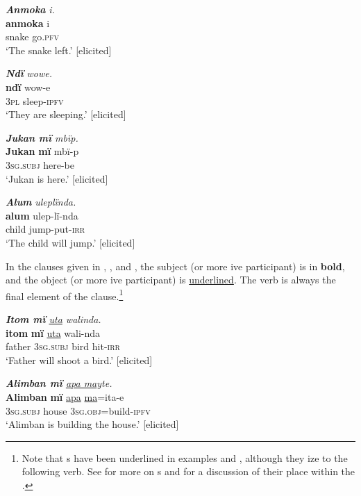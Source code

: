 \ea%
    \label{ex:clause:3}
            \textbf{\textit{Anmoka}} \textit{i.}\\
\gll    \textbf{anmoka}  i\\
    snake    go.\textsc{pfv}\\
\glt `The snake left.’ [elicited]
\z

\ea%
    \label{ex:clause:4}
            \textbf{\textit{Ndï}} \textit{wowe.}\\
\gll    \textbf{ndï}  wow{}-e\\
    \textsc{3pl}  sleep-\textsc{ipfv}\\
\glt `They are sleeping.’ [elicited]
\z

\ea%
    \label{ex:clause:5}
            \textit{\textbf{Jukan mï} mbïp.}\\
\gll    \textbf{Jukan}  \textbf{mï}      mbï-p\\
    [name]  \textsc{3sg.subj}  here-be\\
\glt `Jukan is here.’ [elicited]
\z

\ea%
    \label{ex:clause:6}
            \textbf{\textit{Alum}} \textit{uleplïnda.}\\
\gll    \textbf{alum}  ulep-lï-nda\\
    child  jump-put-\textsc{irr}\\
\glt `The child will jump.’ [elicited]
\z

In the  clauses given in , , and , the subject (or more ive participant) is in \textbf{bold}, and the object (or more ive participant) is \underline{underlined}. The verb is always the final element of the clause.\footnote{Note that  s have been underlined in examples  and , although they ize to the following verb. See  for more on s and  for a discussion of their  place within the .}

\ea%
    \label{ex:clause:7}
            \textit{\textbf{Itom mï} \underline{uta} walinda.}\\
\gll \textbf{itom}  \textbf{mï}      \underline{uta}    wali-nda\\
    father  \textsc{3sg.subj}  bird  hit-\textsc{irr}\\
\glt `Father will shoot a bird.’ [elicited]
\z

\ea%
    \label{ex:clause:8}
            \textit{\textbf{Alimban mï} \underline{apa ma}yte.}\\
\gll    \textbf{Alimban}  \textbf{mï}      \underline{apa}    \underline{ma}=ita-e\\
    [name]    \textsc{3sg.subj}  house  \textsc{3sg.obj}=build-\textsc{ipfv}\\
\glt `Alimban is building the house.’ [elicited]
\z

